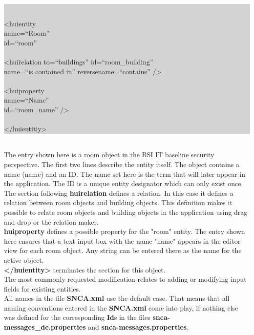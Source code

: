 \documentclass[a4paper,10pt]{book}
\begin{document}
\colorbox{lightgray}{\parbox{\textwidth}{{\tt
\begin{tabbing}
\textless huientity \= \\
\> name=``Room'' \\
\> id=``room'' \\
\\
\> \textless hui\=relation to=``buildings'' id=``room\_building'' \\
\> \> name=``is contained in'' reversename=``contains'' /\textgreater \\
\\
\> \textless huiproperty \\
\> \> name=``Name'' \\
\> \> id=``room\_name'' /\textgreater \\
\\
\textless/huientitiy\textgreater \\
\end{tabbing}}}
}
\newline\\
The entry shown here is a room object in the BSI IT baseline security perspective. The first two lines describe the
entity itself. The object contains a name (name) and an ID. The name set here is the term that will later appear
in the application. The ID is a unique entity designator which can only exist once.
\newline\\
The section following \textbf{huirelation} defines a relation. In this case it defines a relation between room
objects and building objects. This definition makes it possible to relate room objects and building objects in
the application using drag and drop or the relation maker.
\newline\\
\textbf{huiproperty} defines a possible property for the "room" entity. The entry shown here ensures that a text
input box with the name "name" appears in the editor view for each room object. Any string can be entered there
as the name for the active object.
\newline\\
\textbf{\textless/huientity\textgreater} terminates the section for this object.
\newline\\
The most commonly requested modification relates to adding or modifying input fields for existing entities.
\newline\\
All names in the file \textbf{SNCA.xml} use the default case. That means that all naming conventions entered in the \textbf{SNCA.xml} come into play, if nothing else was defined for the corresponding \textbf{Id}s in the files \textbf{snca-messages\_de.properties} and \textbf{snca-messages.properties}.
\end{document}
